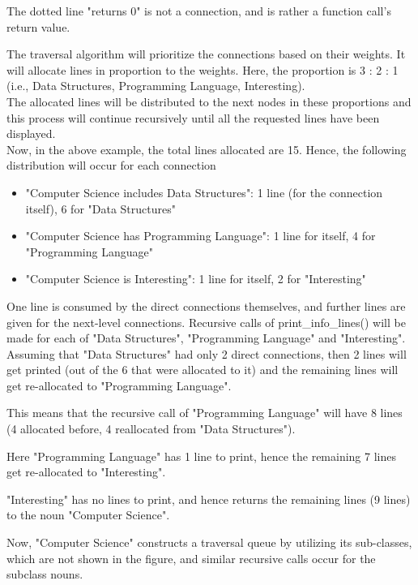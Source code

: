 \documentclass[conference]{IEEEtran}
\begin{document}
The dotted line "returns 0" is not a connection, and is rather a function call's return value.



The traversal algorithm will prioritize the connections based on their weights. It will allocate lines in proportion to the weights. Here, the proportion is 3 : 2 : 1 (i.e., Data Structures, Programming Language, Interesting).\\ The allocated lines will be distributed to the next nodes in these proportions and this process will continue recursively until all the requested lines have been displayed.\\


Now, in the above example, the total lines allocated are 15. Hence, the following distribution will occur for each connection
\begin{itemize}
\item "Computer Science includes Data Structures": 1 line (for the connection itself), 6 for "Data Structures"
\item "Computer Science has Programming Language": 1 line for itself, 4 for "Programming Language"
\item "Computer Science is Interesting": 1 line for itself, 2 for "Interesting"
\end{itemize}

One line is consumed by the direct connections themselves, and further lines are given for the next-level connections.
Recursive calls of print\_info\_lines() will be made for each of "Data Structures", "Programming Language" and "Interesting".\\

Assuming that "Data Structures" had only 2 direct connections, then 2 lines will get printed (out of the 6 that were allocated to it) and the remaining lines will get re-allocated to "Programming Language".

This means that the recursive call of "Programming Language" will have 8 lines (4 allocated before, 4 reallocated from "Data Structures").

Here "Programming Language" has 1 line to print, hence the remaining 7 lines get re-allocated to "Interesting".

"Interesting" has no lines to print, and hence returns the remaining lines (9 lines) to the noun "Computer Science".

Now, "Computer Science" constructs a traversal queue by utilizing its sub-classes, which are not shown in the figure, and similar recursive calls occur for the subclass nouns.
\end{document}

